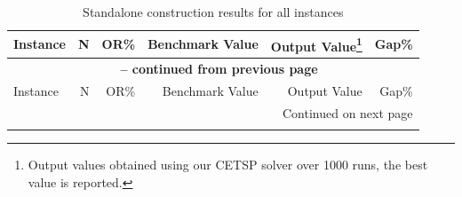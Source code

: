 \documentclass[11pt]{article}
\begin{document}
\begin{longtable}{lrrrrr}
\caption{Standalone construction results for all instances} \label{tab:standalone-comparison} \\
\hline
Instance & N & OR\% & Benchmark Value & Output Value\footnote{Output values obtained using our CETSP solver over 1000 runs, the best value is reported.} & Gap\% \\
\hline
\endfirsthead

\multicolumn{6}{c}{{\bfseries \tablename\ \thetable{} -- continued from previous page}} \\
\hline
Instance & N & OR\% & Benchmark Value & Output Value & Gap\% \\
\hline
\endhead

\hline \multicolumn{6}{r}{{Continued on next page}} \\
\endfoot


\end{longtable}
\end{document}
